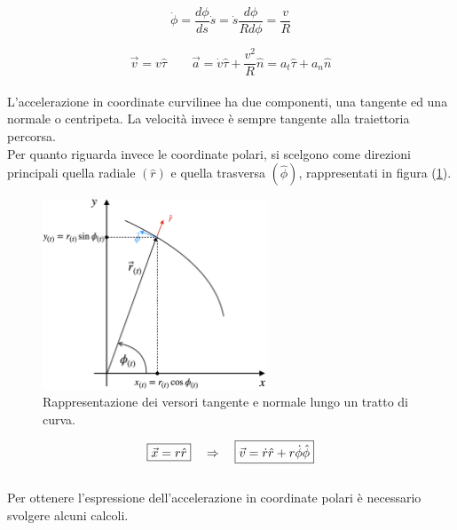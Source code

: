 \begin{equation}
    \dot\phi = \frac{d\phi}{ds}\dot s = \dot s \frac{d\phi}{Rd\phi} =
    \frac{v}{R}
\label{eq:omega}
\end{equation}

\begin{equation}
    \boxed{\vec v = v\hat\tau}\quad\quad \boxed{\vec a =
    \dot v \hat\tau + \frac{v^2}{R}\hat n = a_t\hat\tau + a_n\hat n}
\label{eq:curvilines}
\end{equation}
\\
L'accelerazione in coordinate curvilinee ha due componenti, una tangente ed
una normale o centripeta. La velocità invece è sempre tangente alla
traiettoria percorsa.\\
Per quanto riguarda invece le coordinate polari, si scelgono come direzioni
principali quella radiale $(\hat r)$ e quella trasversa $(\hat\phi)$, rappresentati
in figura (\ref{fig:polaris}).
\begin{figure}[htbp]
    \centering
        \includegraphics[width=0.6\textwidth]{images/coordpol.png}
        \caption{Rappresentazione dei versori tangente e normale lungo un tratto di curva.}
\label{fig:polaris}
\end{figure}

\begin{equation}
    \boxed{\vec x = r\hat r} \quad\Rightarrow\quad \boxed{\vec v = \dot r \hat r +
    r\dot\phi\hat\phi}
\label{eq:polaris_xv}
\end{equation}
\\
Per ottenere l'espressione dell'accelerazione in coordinate polari è
necessario svolgere alcuni calcoli.

